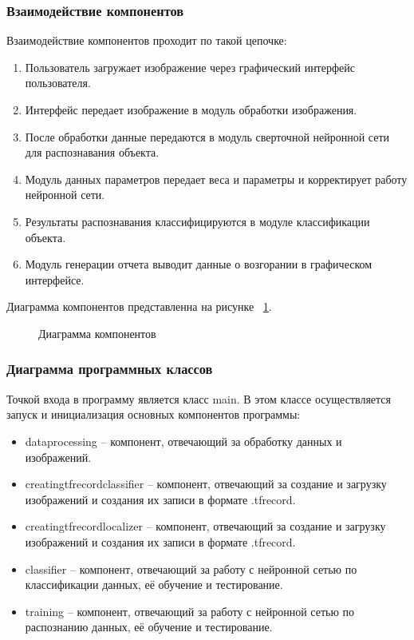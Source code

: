 \subsubsection{Взаимодействие компонентов}

Взаимодействие компонентов проходит по такой цепочке:
\begin{enumerate}
\item Пользователь загружает изображение через графический интерфейс пользователя.
\item Интерфейс передает изображение в модуль обработки изображения.
\item После обработки данные передаются в модуль сверточной нейронной сети для распознавания объекта.
\item Модуль данных параметров передает веса и параметры и корректирует работу нейронной сети.
\item Результаты распознавания классифицируются в модуле классификации объекта.
\item Модуль генерации отчета выводит данные о возгорании в графическом интерфейсе.
\end{enumerate}

Диаграмма компонентов представленна на рисунке ~\ref{comp:image}.

\begin{figure}[H]
\caption{Диаграмма компонентов}
\label{comp:image}
\end{figure}

\subsubsection{Диаграмма программных классов}

Точкой входа в программу является класс main. В этом классе осуществляется запуск и инициализация основных компонентов программы:
\begin{itemize}
	\item dataprocessing -- компонент, отвечающий за обработку данных и изображений.
	\item creatingtfrecordclassifier -- компонент, отвечающий за создание и загрузку изображений и создания их записи в формате .tfrecord.
	\item creatingtfrecordlocalizer -- компонент, отвечающий за создание и загрузку изображений и создания их записи в формате .tfrecord.
	\item classifier -- компонент, отвечающий за работу с нейронной сетью по классификации данных, её обучение и тестирование.
	\item training -- компонент, отвечающий за работу с нейронной сетью по распознанию данных, её обучение и тестирование.
\end{itemize}

